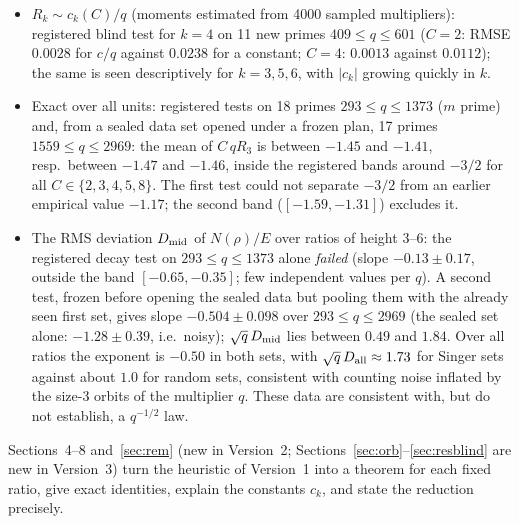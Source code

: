 \documentclass[11pt]{article}
\begin{document}
\begin{itemize}
\item $R_k\sim c_k(C)/q$ (moments estimated from 4000 sampled multipliers): registered blind test for $k=4$ on 11 new primes
$409\le q\le601$ ($C=2$: RMSE $0.0028$ for $c/q$ against $0.0238$ for a constant; $C=4$: $0.0013$ against $0.0112$); the same is seen
descriptively for $k=3,5,6$, with $|c_k|$ growing quickly in $k$.
\item Exact over all units: registered tests on 18 primes $293\le q\le1373$ ($m$ prime) and, from a sealed data set opened under a
frozen plan, 17 primes $1559\le q\le2969$: the mean of $C\,qR_3$ is between $-1.45$ and $-1.41$, resp.\ between $-1.47$ and $-1.46$,
inside the registered bands around $-3/2$ for all $C\in\{2,3,4,5,8\}$. The first test could not separate $-3/2$ from an earlier
empirical value $-1.17$; the second band ($[-1.59,-1.31]$) excludes it.
\item The RMS deviation $D_{\rm mid}$ of $N(\rho)/E$ over ratios of height $3$--$6$: the registered decay test on $293\le q\le1373$
alone \emph{failed} (slope $-0.13\pm0.17$, outside the band $[-0.65,-0.35]$; few independent values per $q$). A second test, frozen
before opening the sealed data but pooling them with the already seen first set, gives slope $-0.504\pm0.098$ over $293\le q\le2969$
(the sealed set alone: $-1.28\pm0.39$, i.e.\ noisy); $\sqrt q\,D_{\rm mid}$ lies between $0.49$ and $1.84$. Over all ratios the exponent is $-0.50$ in both
sets, with $\sqrt q\,D_{\rm all}\approx1.73$ for Singer sets against about $1.0$ for random sets, consistent with counting noise
inflated by the size-3 orbits of the multiplier $q$. These data are consistent with, but do not establish, a $q^{-1/2}$ law.
\end{itemize}
Sections~4--8 and~\ref{sec:rem} (new in Version~2; Sections~\ref{sec:orb}--\ref{sec:resblind} are new in Version~3) turn the heuristic of Version~1 into a theorem for each fixed ratio, give exact identities,
explain the constants $c_k$, and state the reduction precisely.
\end{document}
